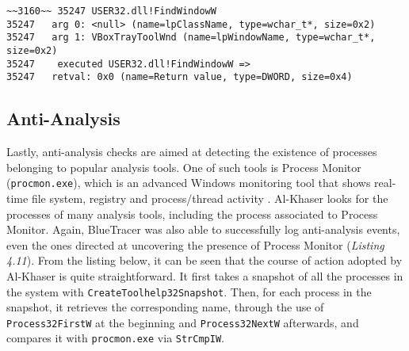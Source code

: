 \vspace{0.5cm}
\begin{lstlisting}[caption={ Log entry relative to \texttt{FindWindowW}},captionpos=b]
~~3160~~ 35247 USER32.dll!FindWindowW
35247 	arg 0: <null> (name=lpClassName, type=wchar_t*, size=0x2)
35247 	arg 1: VBoxTrayToolWnd (name=lpWindowName, type=wchar_t*, size=0x2)
35247    executed USER32.dll!FindWindowW =>
35247 	retval: 0x0 (name=Return value, type=DWORD, size=0x4)
\end{lstlisting}

\subsection{Anti-Analysis}

\iffalse
Check for processes of common anti-analysis tools
\fi

Lastly, anti-analysis checks are aimed at detecting the existence of processes belonging to popular analysis tools. One of such tools is Process Monitor (\texttt{procmon.exe}), which is an advanced Windows monitoring tool that shows real-time file system, registry and process/thread activity \cite{procmon}. Al-Khaser looks for the processes of many analysis tools, including the process associated to Process Monitor. Again, BlueTracer was also able to successfully log anti-analysis events, even the ones directed at uncovering the presence of Process Monitor (\textit{Listing 4.11}). From the listing below, it can be seen that the course of action adopted by Al-Khaser is quite straightforward. It first takes a snapshot of all the processes in the system with \texttt{CreateToolhelp32Snapshot}. Then, for each process in the snapshot, it retrieves the corresponding name, through the use of \texttt{Process32FirstW} at the beginning and \texttt{Process32NextW} afterwards, and compares it with \texttt{procmon.exe} via \texttt{StrCmpIW}. 

